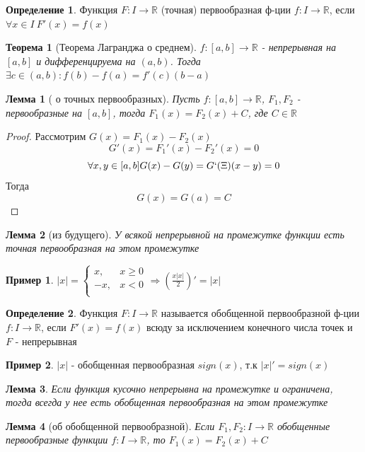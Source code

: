 \documentclass[a4paper]{article}
\newtheorem{theorem}{Теорема}
\newtheorem{lemma}{Лемма}
\theoremstyle{definition}
\newtheorem*{definition*}{Определение}
\newtheorem*{exmp}{Пример}
\numberwithin{theorem}{subsection}
\numberwithin{lemma}{subsection}
\numberwithin{definition}{subsection}
\numberwithin{comment*}{subsection}
\numberwithin{consequence}{subsection}
\numberwithin{property}{subsection}
\begin{document}
\begin{definition*}
 Функция $F: I \rightarrow \mathbb{R}$ (точная) первообразная ф-ции $f: I \rightarrow \mathbb{R}$, если $\forall{x} \in I \ F'(x) = f(x)$
\end{definition*}
\begin{theorem}[Теорема Лагранджа о среднем]
 $f:[a,b]\rightarrow\mathbb{R}$ - непрерывная на $[a,b]$  и дифференцируема на $(a,b)$. Тогда $\exists{c}\in (a,b): f(b)-f(a)=f'(c)(b-a)$
\end{theorem}
\begin{lemma}[ о точных первообразных]
 Пусть $f: [a,b] \rightarrow \mathbb{R}$, $F_1, F_2$ - первообразные на $[a,b]$, тогда $F_1(x)=F_2(x)+C$, где $C \in \mathbb{R}$
\end{lemma}
\begin{proof}
 Рассмотрим $G(x) = F_1(x) - F_2(x)$
 $$ G'(x) = F_1'(x) - F_2'(x) = 0 $$
 $$ \forall{x,y} \in [a,b] G(x) - G(y)=G`(\Xi)(x-y) = 0$$
 Тогда $$G(x)=G(a) = C$$
\end{proof}
\begin{lemma}[из будущего]
 У всякой непрерывной на промежутке функции есть точная первообразная на этом промежутке
\end{lemma}
\begin{exmp}
 $|x| = \begin{cases}
   x,  & x\geq 0 \\
   -x, & x<0     \\
  \end{cases} \Rightarrow
  (\frac{x|x|}{2})'=|x|
 $
\end{exmp}
\begin{definition*}
 Функция $F: I \rightarrow \mathbb{R}$ называется обобщенной первообразной ф-ции $f: I \rightarrow \mathbb{R}$, если $F'(x) = f(x)$ всюду за исключением конечного числа точек и $F$ - непрерывная
\end{definition*}
\begin{exmp}
 $|x|$ - обобщенная первообразная $sign(x)$, т.к $|x|'=sign(x)$
\end{exmp}
\begin{lemma}
 Если функция кусочно непрерывна на промежутке и ограничена, тогда всегда у нее есть обобщенная первообразная на этом промежутке
\end{lemma}
\begin{lemma}[об обобщенной первообразной]
 Если $F_1, F_2: I \rightarrow \mathbb{R}$ обобщенные первообразные функции $f: I \rightarrow \mathbb{R}$, то $F_1(x)= F_2(x)+C$
\end{lemma}
\end{document}
